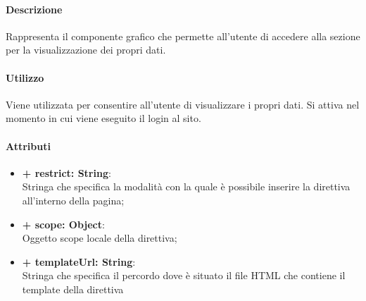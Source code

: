 	\paragraph{Descrizione}
	Rappresenta il componente grafico che permette all'utente di accedere alla sezione per la visualizzazione dei propri dati.
	
	\paragraph{Utilizzo}
	Viene utilizzata per consentire all'utente di visualizzare i propri dati. Si attiva nel momento in cui viene eseguito il login al sito.
	
	\paragraph{Attributi}
	\begin{itemize}
		\item \textbf{+ restrict: String}:\\
		Stringa che specifica la modalità con la quale è possibile inserire la direttiva all'interno della pagina;
		\item \textbf{+ scope: Object}:\\
		Oggetto scope locale della direttiva;
		\item \textbf{+ templateUrl: String}:\\
		Stringa che specifica il percordo dove è situato il file \gls{HTML} che contiene il \gls{template} della direttiva
	\end{itemize}
\newpage
